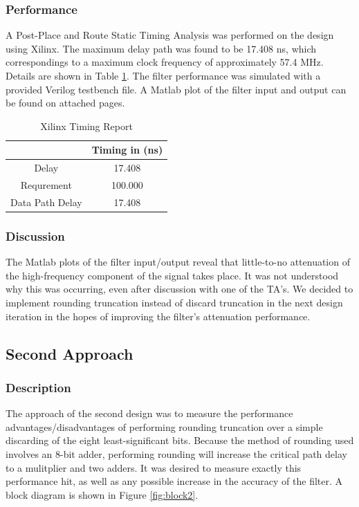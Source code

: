 \lstset{language=verilog}


\subsubsection*{Performance}
A Post-Place and Route Static Timing Analysis was performed on the design using Xilinx. The maximum delay path was found to be 17.408 ns, which correspondings to a maximum clock frequency of approximately 57.4 MHz. Details are shown in Table \ref{tab:timing1}. The filter performance was simulated with a provided Verilog testbench file. A Matlab plot of the filter input and output can be found on attached pages.

\begin{table}[h]
\caption{Xilinx Timing Report}
\begin{center}
\begin{tabular}{c|c}
           & Timing in (ns) \\
\hline
     Delay &   17.408  \\

Requrement &    100.000    \\

Data Path Delay &  17.408   \\
\end{tabular}  
\end{center}
\label{tab:timing1}
\end{table}


\subsubsection*{Discussion}
The Matlab plots of the filter input/output reveal that little-to-no attenuation of the high-frequency component of the signal takes place. It was not understood why this was occurring, even after discussion with one of the TA's. We decided to implement rounding truncation instead of discard truncation in the next design iteration in the hopes of improving the filter's attenuation performance.


\subsection*{Second Approach}
\subsubsection*{Description}
The approach of the second design was to measure the performance advantages/disadvantages of performing rounding truncation over a simple discarding of the eight least-significant bits. Because the method of rounding used involves an 8-bit adder, performing rounding will increase the critical path delay to a mulitplier and two adders. It was desired to measure exactly this performance hit, as well as any possible increase in the accuracy of the filter. A block diagram is shown in Figure \ref{fig:block2}.

